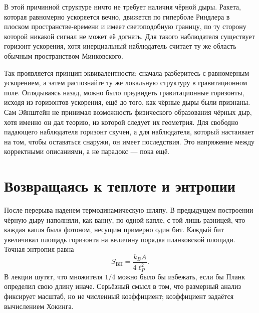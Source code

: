 В этой причинной структуре ничто не требует наличия чёрной дыры. Ракета, которая равномерно ускоряется вечно, движется по гиперболе Риндлера в плоском пространстве-времени и имеет светоподобную границу, по ту сторону которой никакой сигнал не может её догнать. Для такого наблюдателя существует горизонт ускорения, хотя инерциальный наблюдатель считает ту же область обычным пространством Минковского.

\begin{classroomqa}
\end{classroomqa}

Так проявляется принцип эквивалентности: сначала разберитесь с равномерным ускорением, а затем распознайте ту же локальную структуру в гравитационном поле. Оглядываясь назад, можно было предвидеть гравитационные горизонты, исходя из горизонтов ускорения, ещё до того, как чёрные дыры были признаны. Сам Эйнштейн не принимал возможность физического образования чёрных дыр, хотя именно он дал теорию, из которой следует их геометрия. Для свободно падающего наблюдателя горизонт скучен, а для наблюдателя, который настаивает на том, чтобы оставаться снаружи, он имеет последствия. Это напряжение между корректными описаниями, а не парадокс — пока ещё.

\section{Возвращаясь к теплоте и энтропии}

После перерыва наденем термодинамическую шляпу. В предыдущем построении чёрную дыру наполняли, как ванну, по одной капле, с той лишь разницей, что каждая капля была фотоном, несущим примерно один бит. Каждый бит увеличивал площадь горизонта на величину порядка планковской площади. Точная энтропия равна
\begin{equation}
S_{\mathrm{BH}}=\frac{k_B A}{4\ell_P^2}.
\end{equation}
В лекции шутят, что множителя \(1/4\) можно было бы избежать, если бы Планк определил свою длину иначе. Серьёзный смысл в том, что размерный анализ фиксирует масштаб, но не численный коэффициент; коэффициент задаётся вычислением Хокинга.

